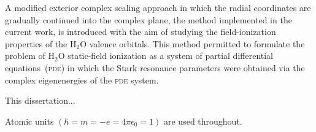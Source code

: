 
A modified exterior complex scaling approach in which the radial
coordinates are gradually continued into the complex plane, the method
implemented in the current work, is introduced with the aim of
studying the field-ionization properties of the H$_{2}$O valence
orbitals. This method permitted to formulate the problem of H$_{2}$O
static-field ionization as a system of partial differential
equations~(\textsc{pde}) in which the Stark resonance parameters were
obtained via the complex eigenenergies of the \textsc{pde} system.












This dissertation...



Atomic units $(\hbar = m = -e = 4\pi\epsilon_{0} = 1)$ are used
throughout.

































